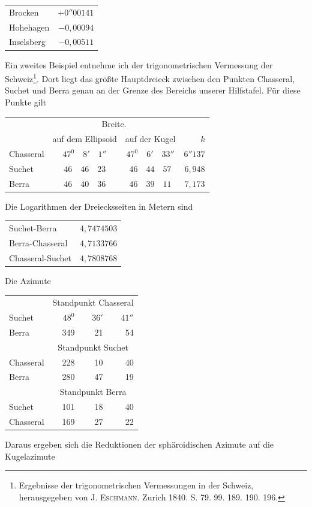 %
\begin{center}
\begin{tabular}{lr}
Brocken&\(+0''00141\)\\
Hohehagen&\(-0{,}00094\)\\
Inselsberg&\(-0{,}00511\)
\end{tabular}
\end{center}
\hspace*{\parindent}Ein zweites Beispiel entnehme ich der trigonometrischen Vermessung der Schweiz\footnote{Ergebnisse der trigonometrischen Vermessungen in der Schweiz, herausgegeben von J. \textsc{Eschmann}. Zurich 1840. S. 79. 99. 189. 190. 196.}. Dort liegt das größte Hauptdreieck zwischen den Punkten Chasseral, Suchet und Berra genau an der Grenze des Bereichs unserer Hilfstafel. Für diese Punkte gilt
\begin{center}
\begin{tabular}{l|c|c|r}
&\multicolumn{2}{c|}{Breite.}&\\
&auf dem Ellipsoid&auf der Kugel&\(k\)\\\hline
Chasseral&\(47^0\quad8'\quad1''\)&\(47^0\quad6'\quad33''\)&\(6''137\)\\
Suchet&\(46\quad46\quad23\)&\(46\quad44\quad57\)&\(6{,}948\)\\
Berra&\(46\quad40\quad36\)&\(46\quad39\quad11\)&\(7{,}173\)
\end{tabular}
\end{center}
Die Logarithmen der Dreiecksseiten in Metern sind
\begin{center}
\begin{tabular}{lr}
Suchet-Berra&\(4{,}7474503\)\\
Berra-Chasseral&\(4{,}7133766\)\\
Chasseral-Suchet&\(4{,}7808768\)
\end{tabular}
\end{center}
Die Azimute
\begin{center}
\begin{tabular}{lrrr}
&\multicolumn{3}{c}{Standpunkt Chasseral}\\
Suchet&\(48^0\)&\(36'\)&\(41''\)\\
Berra&349&21&54\\
&\multicolumn{3}{c}{Standpunkt Suchet}\\
Chasseral&228&10&40\\
Berra&280&47&19\\
&\multicolumn{3}{c}{Standpunkt Berra}\\
Suchet&101&18&40\\
Chasseral&169&27&22
\end{tabular}
\end{center}
\hspace*{\parindent}Daraus ergeben sich die Reduktionen der sphäroidischen Azimute auf die Kugelazimute
